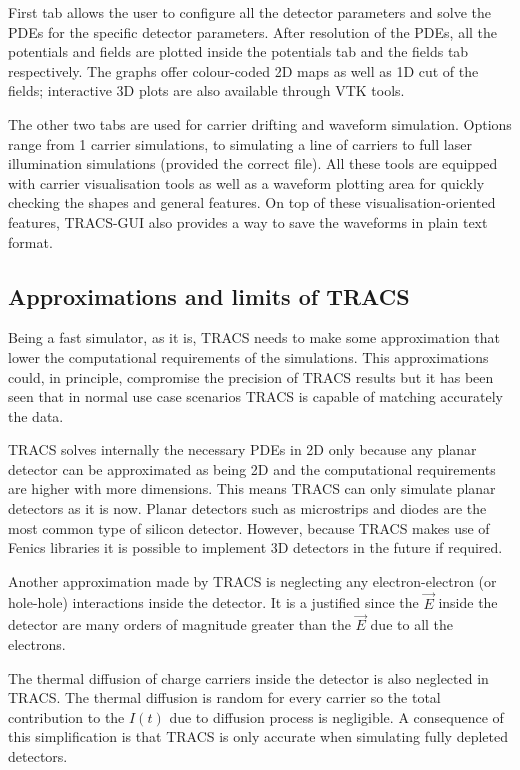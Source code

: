 First tab allows the user to configure all the detector parameters and solve the PDEs for the specific detector parameters. After resolution of the PDEs, all the potentials and fields are plotted inside the potentials tab and the fields tab respectively. The graphs offer colour-coded 2D maps as well as 1D cut of the fields; interactive 3D plots are also available through VTK tools.

The other two tabs are used for carrier drifting and waveform simulation. Options range from 1 carrier simulations, to simulating a line of carriers to full laser illumination simulations (provided the correct file). All these tools are equipped with carrier visualisation tools as well as a waveform plotting area for quickly checking the shapes and general features. On top of these visualisation-oriented features, TRACS-GUI also provides a way to save the waveforms in plain text format.

\subsection{Approximations and limits of TRACS} %
\label{sec:approxTRACS}

Being a fast simulator, as it is, TRACS needs to make some approximation that lower the computational requirements of the simulations. This approximations could, in principle, compromise the precision of TRACS results but it has been seen that in normal use case scenarios TRACS is capable of matching accurately the data\cite{TRACSCompar}.
 
TRACS solves internally the necessary PDEs in 2D only because any planar detector can be approximated as being 2D and the computational requirements are higher with more dimensions. This means TRACS can only simulate planar detectors as it is now. Planar detectors such as microstrips and diodes are the most common type of silicon detector. However, because TRACS makes use of Fenics libraries it is possible to implement 3D detectors in the future if required.

Another approximation made by TRACS is neglecting any electron-electron (or hole-hole) interactions inside the detector. It is a justified since the $\overrightarrow E$ inside the detector are many orders of magnitude greater than the $\overrightarrow E$ due to all the electrons.

The thermal diffusion of charge carriers inside the detector is also neglected in TRACS. The thermal diffusion is random for every carrier so the total contribution to the $I(t)$ due to diffusion process is negligible. A consequence of this simplification is that TRACS is only accurate when simulating fully depleted detectors. 


